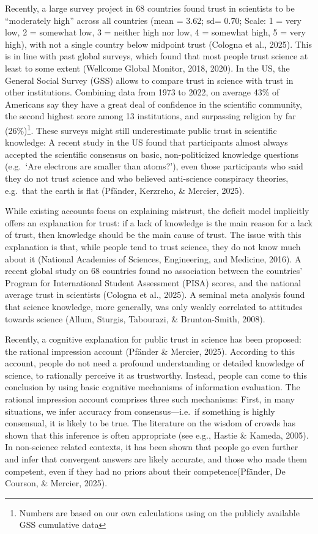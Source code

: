 \documentclass[
  english,
  doc,floatsintext]{apa6}
\begin{document}
Recently, a large survey project in 68 countries found trust in scientists to be ``moderately high'' across all countries (mean = 3.62; sd= 0.70; Scale: 1 = very low, 2 = somewhat low, 3 = neither high nor low, 4 = somewhat high, 5 = very high), with not a single country below midpoint trust (Cologna et al., 2025). This is in line with past global surveys, which found that most people trust science at least to some extent (Wellcome Global Monitor, 2018, 2020). In the US, the General Social Survey (GSS) allows to compare trust in science with trust in other institutions. Combining data from 1973 to 2022, on average 43\% of Americans say they have a great deal of confidence in the scientific community, the second highest score among 13 institutions, and surpassing religion by far (26\%)\footnote{Numbers are based on our own calculations using on the publicly available GSS cumulative data}. These surveys might still underestimate public trust in scientific knowledge: A recent study in the US found that participants almost always accepted the scientific consensus on basic, non-politicized knowledge questions (e.g.~`Are electrons are smaller than atoms?'), even those participants who said they do not trust science and who believed anti-science conspiracy theories, e.g.~that the earth is flat (Pfänder, Kerzreho, \& Mercier, 2025).

While existing accounts focus on explaining mistrust, the deficit model implicitly offers an explanation for trust: if a lack of knowledge is the main reason for a lack of trust, then knowledge should be the main cause of trust. The issue with this explanation is that, while people tend to trust science, they do not know much about it (National Academies of Sciences, Engineering, and Medicine, 2016). A recent global study on 68 countries found no association between the countries' Program for International Student Assessment (PISA) scores, and the national average trust in scientists (Cologna et al., 2025). A seminal meta analysis found that science knowledge, more generally, was only weakly correlated to attitudes towards science (Allum, Sturgis, Tabourazi, \& Brunton-Smith, 2008).

Recently, a cognitive explanation for public trust in science has been proposed: the rational impression account (Pfänder \& Mercier, 2025). According to this account, people do not need a profound understanding or detailed knowledge of science, to rationally perceive it as trustworthy. Instead, people can come to this conclusion by using basic cognitive mechanisms of information evaluation. The rational impression account comprises three such mechanisms: First, in many situations, we infer accuracy from consensus---i.e.~if something is highly consensual, it is likely to be true. The literature on the wisdom of crowds has shown that this inference is often appropriate (see e.g., Hastie \& Kameda, 2005). In non-science related contexts, it has been shown that people go even further and infer that convergent answers are likely accurate, and those who made them competent, even if they had no priors about their competence(Pfänder, De Courson, \& Mercier, 2025).
\end{document}
